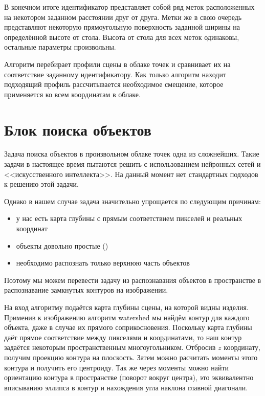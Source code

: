             В конечном итоге идентификатор представляет собой ряд меток расположенных на некотором заданном расстоянии друг от друга. Метки же в свою очередь представляют некоторую прямоугольную поверхность заданной ширины на определённой высоте от стола. Высота от стола для всех меток одинаковы, остальные параметры произвольны.
            
            Алгоритм перебирает профили сцены в облаке точек и сравнивает их на соответствие заданному идентификатору. Как только алгоритм находит подходящий профиль рассчитывается необходимое смещение, которое применяется ко всем координатам в облаке.
            
    \section{Блок поиска объектов}
        Задача поиска объектов в произвольном облаке точек одна из сложнейших. Такие задачи в настоящее время пытаются решить с использованием нейронных сетей и <<искусственного интеллекта>>. На данный момент нет стандартных подходов к решению этой задачи.
        
        Однако в нашем случае задача значительно упрощается по следующим причинам:
        \begin{itemize}
            \item у нас есть карта глубины с прямым соответствием пикселей и реальных координат
            \item объекты довольно простые ()
            \item необходимо распознать только верхнюю часть объектов
        \end{itemize}
        Поэтому мы можем перевести задачу из распознавания объектов в пространстве в распознавание замкнутых контуров на изображении.
        
        
        На вход алгоритму подаётся карта глубины сцены, на которой видны изделия. Применив к изображению алгоритм watershed мы найдём контур для каждого объекта, даже в случае их прямого соприкосновения. Поскольку карта глубины даёт прямое соответствие между пикселями и координатами, то наш контур задаётся некоторым пространственным многоугольником. Отбросив $ z $ координату, получим проекцию контура на плоскость. Затем можно расчитать моменты этого контура и получить его центроиду. Так же через моменты можно найти ориентацию контура в пространстве (поворот вокруг центра), это эквивалентно вписыванию эллипса в контур и нахождения угла наклона главной диагонали.
        
